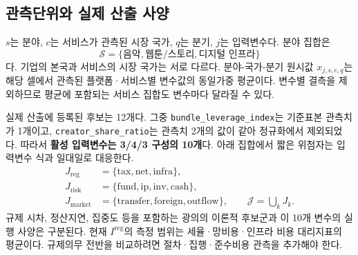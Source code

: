\documentclass[11pt,a4paper]{report}
\begin{document}
\subsection{관측단위와 실제 산출 사양}
\(s\)는 분야, \(c\)는 서비스가 관측된 시장 국가, \(q\)는 분기, \(j\)는 입력변수다. 분야 집합은
\[
\mathcal S=\{\text{음악},\text{웹툰/스토리},\text{디지털 인프라}\}
\]
다. 기업의 본국과 서비스의 시장 국가는 서로 다르다. 분야-국가-분기 원시값 \(x_{j,s,c,q}\)는 해당 셀에서 관측된 플랫폼·서비스별 변수값의 동일가중 평균이다. 변수별 결측을 제외하므로 평균에 포함되는 서비스 집합도 변수마다 달라질 수 있다.

실제 산출에 등록된 후보는 12개다. 그중 \nolinkurl{bundle_leverage_index}는 기준표본 관측치가 1개이고, \nolinkurl{creator_share_ratio}는 관측치 2개의 값이 같아 정규화에서 제외되었다. 따라서 \textbf{활성 입력변수는 3/4/3 구성의 10개}다. 아래 집합에서 짧은 위첨자는 입력변수 식과 일대일로 대응한다.
\[
\begin{aligned}
J_{\mathrm{reg}}&=\{\mathrm{tax},\mathrm{net},\mathrm{infra}\},\\
J_{\mathrm{risk}}&=\{\mathrm{fund},\mathrm{ip},\mathrm{inv},\mathrm{cash}\},\\
J_{\mathrm{market}}&=\{\mathrm{transfer},\mathrm{foreign},\mathrm{outflow}\},
\qquad \mathcal J=\bigcup_k J_k .
\end{aligned}
\]
규제 시차, 정산지연, 집중도 등을 포함하는 광의의 이론적 후보군과 이 10개 변수의 실행 사양은 구분된다. 현재 \(I^{\mathrm{reg}}\)의 측정 범위는 세율·망비용·인프라 비용 대리지표의 평균이다. 규제의무 전반을 비교하려면 절차·집행·준수비용 관측을 추가해야 한다.
\end{document}
